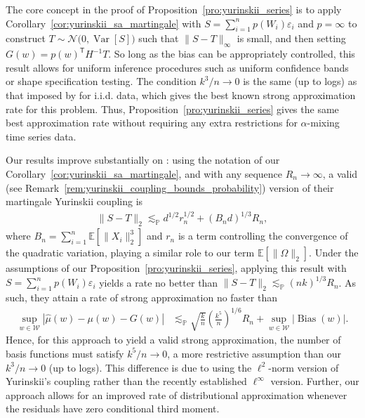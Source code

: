 \documentclass[11pt,lof]{puthesis}
\renewcommand{\P}{\ensuremath{\mathbb{P}}}
\newcommand{\E}{\ensuremath{\mathbb{E}}}
\newcommand{\cN}{\ensuremath{\mathcal{N}}}
\newcommand{\cW}{\ensuremath{\mathcal{W}}}
\newcommand{\T}{\ensuremath{\mathsf{T}}}
\DeclareMathOperator{\Var}{Var}
\DeclareMathOperator{\Bias}{Bias}
\theoremstyle{break}
\theoremstyle{proof}
\begin{document}
The core concept in the proof of Proposition~\ref{pro:yurinskii_series} is to
apply Corollary~\ref{cor:yurinskii_sa_martingale} with $S = \sum_{i=1}^n p(W_i)
\varepsilon_i$ and $p=\infty$ to construct $T \sim \cN\big(0, \Var[S]\big)$ such
that $\|S - T \|_\infty$ is small, and then setting $G(w) = p(w)^\T H^{-1} T$.
So long as the bias can be appropriately controlled, this result allows for
uniform inference procedures such as uniform confidence bands or shape
specification testing. The condition $k^3 / n \to 0$ is the same (up to logs) as
that imposed by \citet{cattaneo2020large} for i.i.d. data, which gives the best
known strong approximation rate for this problem. Thus,
Proposition~\ref{pro:yurinskii_series} gives the same best approximation rate
without requiring any extra restrictions for $\alpha$-mixing time series data.

Our results improve substantially on \citet[Theorem~1]{li2020uniform}: using
the notation of our Corollary~\ref{cor:yurinskii_sa_martingale}, and with any
sequence $R_n \to \infty$, a valid (see
Remark~\ref{rem:yurinskii_coupling_bounds_probability}) version of their
martingale Yurinskii coupling is
%
\begin{align*}
  \|S-T\|_2
  \lesssim_\P
  d^{1/2} r^{1/2}_n
  + (B_n d)^{1/3} R_n,
\end{align*}
%
where $B_n = \sum_{i=1}^n \E[\|X_i\|_2^3]$ and $r_n$ is a term controlling the
convergence of the quadratic variation, playing a similar role to our
term $\E[\|\Omega\|_2]$. Under the assumptions of our
Proposition~\ref{pro:yurinskii_series}, applying this
result with $S = \sum_{i=1}^n p(W_i) \varepsilon_i$ yields a rate no better
than $\|S-T\|_2 \lesssim_\P (n k)^{1/3} R_n$. As such, they attain a rate of
strong approximation no faster than
%
\begin{align*}
  \sup_{w \in \cW}
  \left| \hat\mu(w) - \mu(w) - G(w) \right|
  &\lesssim_\P
  \sqrt{\frac{k}{n}}
  \left( \frac{k^5}{n} \right)^{1/6} R_n
  + \sup_{w \in \cW} |\Bias(w)|.
\end{align*}
%
Hence, for this approach to yield a valid strong approximation, the number of
basis functions must satisfy $k^5/n \to 0$, a more restrictive assumption than
our $k^3 / n \to 0$ (up to logs). This difference is due to
\citet{li2020uniform} using the $\ell^2$-norm version of Yurinskii's coupling
rather than the recently established $\ell^\infty$ version. Further,
our approach allows for an improved rate of distributional approximation
whenever the residuals have zero conditional third moment.
\end{document}
